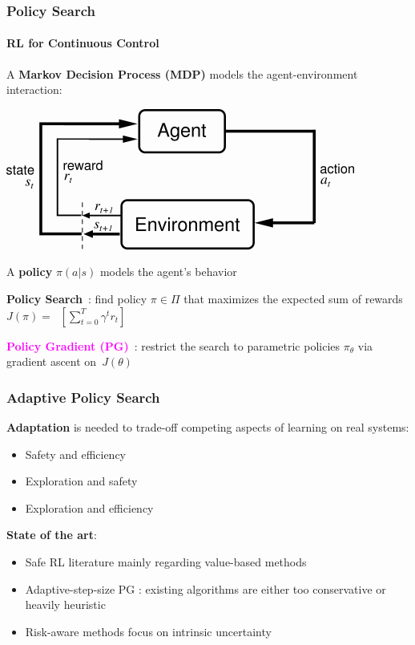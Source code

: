 \documentclass{beamer}
\begin{document}
\begin{frame}
\frametitle{Policy Search}
\framesubtitle{RL for Continuous Control}
A \textbf{Markov Decision Process (MDP)} models the agent-environment interaction:
\begin{center}
	\includegraphics[width=.5\textwidth]{pics/rl.png}
\end{center}
A \textbf{policy} $\pi(a\vert s)$ models the agent's behavior

\vfill

\textbf{Policy Search}~\cite{deisenroth2013survey}: find policy $\pi \in \Pi$ that maximizes the expected sum of rewards ${J(\pi) = \mathop{E_{\pi}}\left[\sum_{t=0}^{T}\gamma^tr_t\right]}$

\textbf{\textcolor{magenta}{Policy Gradient (PG)}}~\cite{sutton2000policy}: restrict the search to parametric policies $\pi_{\theta}$ via gradient ascent on~$J(\theta)$

\end{frame}


\begin{frame}
\frametitle{Adaptive Policy Search}

\textbf{Adaptation} is needed to trade-off competing aspects of learning on real systems:
\begin{itemize}
	\item Safety and efficiency
	\item Exploration and safety
	\item Exploration and efficiency
\end{itemize}

\vfill


\vfill

\textbf{State of the art}:
\begin{itemize}
	\item Safe RL literature \cite{garcia2015comprehensive} mainly regarding value-based methods 
	\item Adaptive-step-size PG \cite{pirotta2013adaptive,schulman2015trust}: existing algorithms are either too conservative  or heavily heuristic
	\item Risk-aware methods \cite{moldovan2014safety} focus on intrinsic uncertainty
\end{itemize}

\end{frame}
\end{document}
